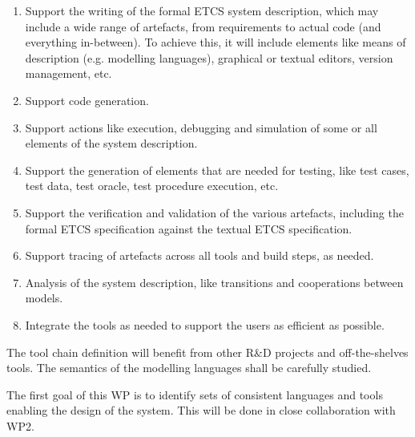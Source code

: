 \documentclass{template/openetcs_article}
\begin{document}
\begin{enumerate}
\item Support the writing of the formal ETCS system
  description, which may include a wide range of artefacts, from requirements to actual code (and everything in-between).  To achieve this, it will include elements like means of description (e.g. modelling languages), graphical or textual editors, version management, etc.

\item Support code generation.

\item Support actions like execution, debugging and simulation of some or all elements of the system description.

\item Support the generation of elements that are needed for testing, like test cases, test data, test oracle, test procedure execution, etc.

\item Support the verification and validation of the various artefacts, including the formal ETCS specification against the textual ETCS specification.


\item Support tracing of artefacts across all tools and build steps, as needed.

\item Analysis of the system description, like transitions and cooperations between models.

\item Integrate the tools as needed to support the users as efficient as possible.
 
\end{enumerate}

The tool chain definition will benefit from other R\&D projects and off-the-shelves tools. The semantics of the modelling languages shall be carefully studied.

The first goal of this WP is to identify sets of consistent languages and tools enabling the design of the system.  This will be done in close collaboration with WP2.
\end{document}
